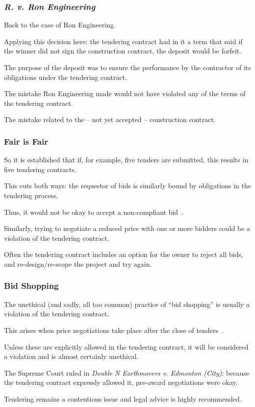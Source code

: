 \begin{frame}
\frametitle{\textit{R. v. Ron Engineering}}

Back to the case of Ron Engineering.

Applying this decision here: the tendering contract had in it a term that said if the winner did not sign the construction contract, the deposit would be forfeit.

The purpose of the deposit was to ensure the performance by the contractor of its obligations under the tendering contract. 

The mistake Ron Engineering made would not have violated any of the terms of the tendering contract.

The mistake related to the -- not yet accepted -- construction contract. 

\end{frame}



\begin{frame}
\frametitle{Fair is Fair}

So it is established that if, for example, five tenders are submitted, this results in five tendering contracts. 

This cuts both ways: the requestor of bids is similarly bound by obligations in the tendering process.

Thus, it would not be okay to accept a non-compliant bid~\cite{lpe}.

Similarly, trying to negotiate a reduced price with one or more bidders could be a violation of the tendering contract.

Often the tendering contract includes an option for the owner to reject all bids, and re-design/re-scope the project and try again.

\end{frame}




\begin{frame}
\frametitle{Bid Shopping}

The unethical (and sadly, all too common) practice of ``bid shopping'' is usually a violation of the tendering contract.

This arises when price negotiations take place after the close of tenders~\cite{lpe}.

Unless these are explicitly allowed in the tendering contract, it will be considered a violation and is almost certainly unethical.

The Supreme Court ruled in \textit{Double N Earthmovers v. Edmonton (City)}: because the tendering contract expressly allowed it, pre-award negotiations were okay.

Tendering remains a contentious issue and legal advice is highly recommended.

\end{frame}


